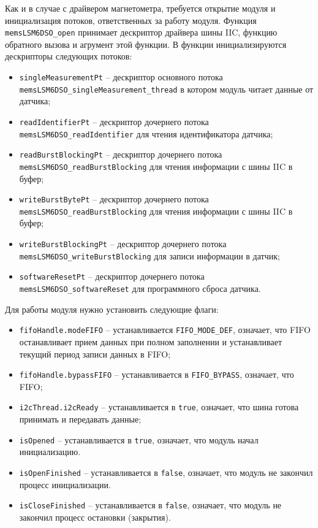 Как и в случае с драйвером магнетометра, требуется открытие модуля и инициализация потоков, ответственных за
работу модуля. Функция \lstinline{memsLSM6DSO_open} принимает дескриптор драйвера шины IIC, функцию обратного вызова
и агрумент этой функции. В функции инициализируются дескрипторы следующих потоков:

\begin{itemize}
    \item \lstinline{singleMeasurementPt} -- дескриптор основного потока \lstinline{memsLSM6DSO_singleMeasurement_thread} в котором модуль читает данные от датчика;
    \item \lstinline{readIdentifierPt} -- дескриптор дочернего потока \lstinline{memsLSM6DSO_readIdentifier} для чтения идентификатора датчика;
    \item \lstinline{readBurstBlockingPt} --  дескриптор дочернего потока \lstinline{memsLSM6DSO_readBurstBlocking} для чтения информации с шины IIC в буфер;
    \item \lstinline{writeBurstBytePt} --  дескриптор дочернего потока \lstinline{memsLSM6DSO_readBurstBlocking} для чтения информации с шины IIC в буфер;
    \item \lstinline{writeBurstBlockingPt} --  дескриптор дочернего потока \lstinline{memsLSM6DSO_writeBurstBlocking} для записи информации в датчик;
    \item \lstinline{softwareResetPt} --  дескриптор дочернего потока \lstinline{memsLSM6DSO_softwareReset} для программного сброса датчика.
\end{itemize}

Для работы модуля нужно установить следующие флаги:

\begin{itemize}
    \item \lstinline{fifoHandle.modeFIFO} -- устанавливается \lstinline{FIFO_MODE_DEF},
    означает, что FIFO останавливает прием данных при полном заполнении и устанавливает текущий период записи данных в FIFO;
    \item \lstinline{fifoHandle.bypassFIFO} -- устанавливается в \lstinline{FIFO_BYPASS}, означает, что FIFO;
    \item \lstinline{i2cThread.i2cReady} -- устанавливается в \lstinline{true}, означает, что шина готова принимать и передавать данные;
    \item \lstinline{isOpened} -- устанавливается в \lstinline{true}, означает, что модуль начал инициализацию.
    \item \lstinline{isOpenFinished} -- устанавливается в \lstinline{false}, означает, что модуль не закончил процесс инициализации.
    \item \lstinline{isCloseFinished} -- устанавливается в \lstinline{false}, означает, что модуль не закончил процесс остановки (закрытия).
\end{itemize}


